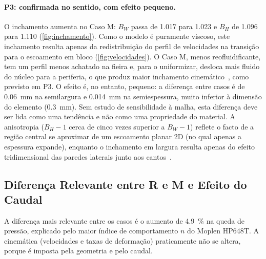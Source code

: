 \paragraph{P3: confirmada no sentido, com efeito pequeno.} O inchamento aumenta no Caso M: $B_W$ passa de \num{1,017} para \num{1,023} e $B_H$ de \num{1,096} para \num{1,110} (\autoref{fig:inchamento}). Como o modelo é puramente viscoso, este inchamento resulta apenas da redistribuição do perfil de velocidades na transição para o escoamento em bloco (\autoref{fig:velocidades}). O Caso M, menos reofluidificante, tem um perfil menos achatado na fieira e, para o uniformizar, desloca mais fluido do núcleo para a periferia, o que produz maior inchamento cinemático~\cite{Comminal2018Extrudate}, como previsto em P3. O efeito é, no entanto, pequeno: a diferença entre casos é de \qty{0,06}{\milli\metre} na semilargura e \qty{0,014}{\milli\metre} na semiespessura, muito inferior à dimensão do elemento (\qty{0,3}{\milli\metre}). Sem estudo de sensibilidade à malha, esta diferença deve ser lida como uma tendência e não como uma propriedade do material. A anisotropia ($B_H - 1$ cerca de cinco vezes superior a $B_W - 1$) reflete o facto de a região central se aproximar de um escoamento planar 2D (no qual apenas a espessura expande), enquanto o inchamento em largura resulta apenas do efeito tridimensional das paredes laterais junto aos cantos~\cite{Zhang2026Anisotropic,Tang2019Polypropylene}.

\subsection{Diferença Relevante entre R e M e Efeito do Caudal}

A diferença mais relevante entre os casos é o aumento de \qty{4,9}{\percent} na queda de pressão, explicado pelo maior índice de comportamento $n$ do Moplen HP648T. A cinemática (velocidades e taxas de deformação) praticamente não se altera, porque é imposta pela geometria e pelo caudal.


